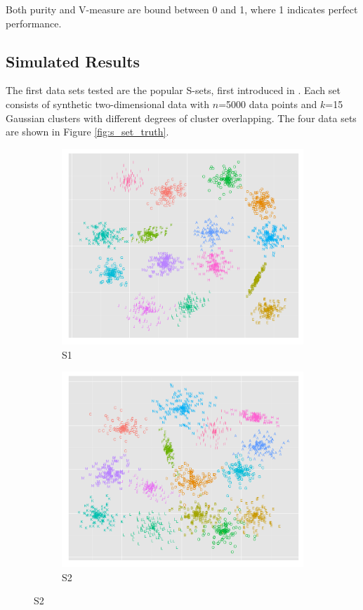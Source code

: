 Both purity and V-measure are bound between 0 and 1, where 1 indicates perfect performance. 


\subsection{Simulated Results}

The first data sets tested are the popular S-sets, first introduced in \cite{Franti2006}. Each set consists of synthetic two-dimensional data with $n$=5000 data points and $k$=15 Gaussian clusters with different degrees of cluster overlapping.  The four data sets are shown in Figure \ref{fig:s_set_truth}. 

\begin{figure}[H]
\centering
\begin{subfigure}{.4\textwidth}
  \centering
  \includegraphics[width=.9\linewidth]{s_set/s_set_1_truth.png}
  \caption{S1}
\end{subfigure}%
\begin{subfigure}{.4\textwidth}
  \centering
  \includegraphics[width=.9\linewidth]{s_set/s_set_2_truth.png}
  \caption{S2}
\end{subfigure}


\end{figure}

